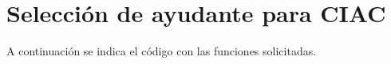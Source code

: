 \section{Selección de ayudante para CIAC}

  A continuación se indica el código con las funciones
  solicitadas.
  
    